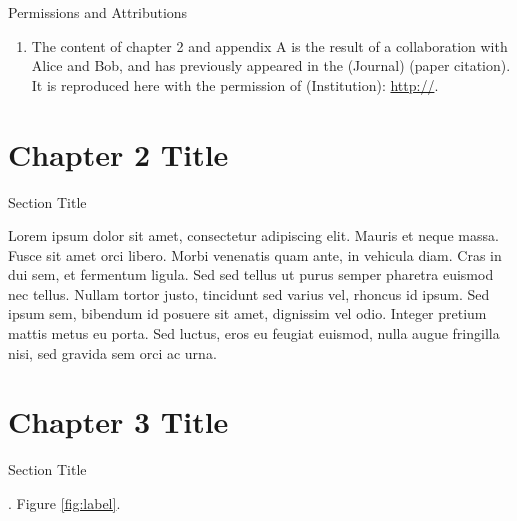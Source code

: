\documentclass[oneside,12pt,final]{ucthesis-CA2012}
\begin{document}
\begin{mainmatter}
\begin{section}{Permissions and Attributions}
\begin{enumerate}
\item The content of chapter 2 and appendix A is the result of a collaboration with Alice and Bob, and has previously appeared in the (Journal) (paper citation). It is reproduced here with the permission of (Institution): \url{http://}.

\end{enumerate}
\end{section}

\chapter{Chapter 2 Title}
\begin{section}{Section Title}

Lorem ipsum dolor sit amet, consectetur adipiscing elit. Mauris et neque massa. Fusce sit amet orci libero. Morbi venenatis quam ante, in vehicula diam. Cras in dui sem, et fermentum ligula. Sed sed tellus ut purus semper pharetra euismod nec tellus. Nullam tortor justo, tincidunt sed varius vel, rhoncus id ipsum. Sed ipsum sem, bibendum id posuere sit amet, dignissim vel odio. Integer pretium mattis metus eu porta. Sed luctus, eros eu feugiat euismod, nulla augue fringilla nisi, sed gravida sem orci ac urna.

\end{section}

\chapter{Chapter 3 Title}
\begin{section}{Section Title}

\cite{Maldacena:1997re,joesbook}. Figure \ref{fig:label}.


\end{section}
\end{mainmatter}
\end{document}
